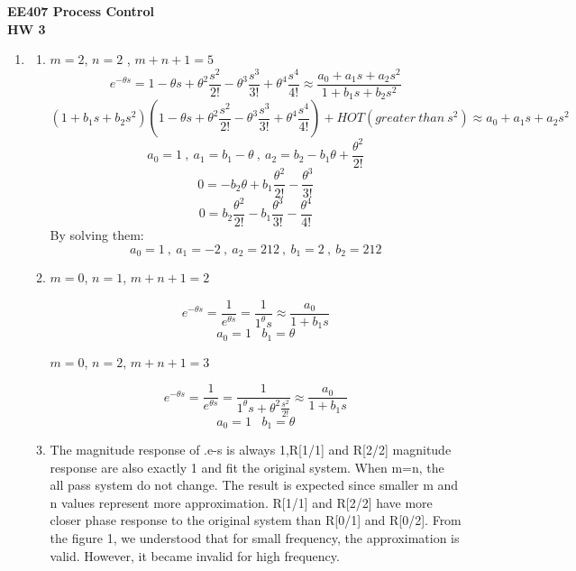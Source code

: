 \documentclass[a4paper,12pt]{article}
\begin{document}
\begin{center}
	\textbf{\large EE407 Process Control \\[0.2cm] HW 3} \\
\end{center}


\begin{enumerate}

	\item
		
			\begin{enumerate}
				\item $ m=2 $, $n=2$ , $m+n+1=5$  
					$$ e^{-\theta s}=1-\theta s+\theta^2 \frac{s^2}{2!}-\theta^3\frac{s^3}{3!}+\theta^4\frac{s^4}{4!} \approx  \frac{a_0+a_1s+a_2s^2}{1+b_1s+b_2s^2}$$
					$$ (1+b_1s+b_2s^2)(1-\theta s+\theta^2 \frac{s^2}{2!}-\theta^3\frac{s^3}{3!}+\theta^4\frac{s^4}{4!})+HOT(greater\ than\ s^2) \approx a_0+a_1s+a_2s^2 $$
					$$ a_0=1\ ,\ a_1=b_1-\theta\ ,\ a_2=b_2-b_1\theta+ \frac{\theta^2}{2!}$$
					$$ 0=-b_2\theta+b_1 \frac{\theta^2}{2!} - \frac{\theta^3}{3!}$$
					$$ 0= b_2 \frac{\theta^2}{2!}-b_1 \frac{\theta^3}{3!}- \frac{\theta^4}{4!}$$ 
			By solving them:
				$$\boxed{ a_0=1}\ ,\ \boxed{a_1=-2}\ ,\ \boxed{a_2=212}\ ,\ \boxed{b_1=2}\ ,\  \boxed{b_2=212} $$ 
				
				\item $m=0$, $n=1$, $m+n+1=2$
				
					$$ e^{-\theta s} = \frac{1}{ e^{\theta s}}=\frac{1}{1^\theta s} \approx \frac{a_0}{1+b_1s} $$
					$$ \boxed{a_0=1}\ \,\ \ \boxed{b_1=\theta}$$
					
					$m=0$, $n=2$, $m+n+1=3$
				
					$$ e^{-\theta s} = \frac{1}{ e^{\theta s}}=\frac{1}{1^\theta s+\theta^2\frac{s^2}{2!}} \approx \frac{a_0}{1+b_1s} $$
					$$ \boxed{a_0=1}\ \,\ \ \boxed{b_1=\theta}$$
					
				
			\item The magnitude response of .e-s is always 1,R[1/1] and R[2/2] magnitude response are also exactly 1 and fit the original system. When m=n, the all pass system do not change.  The result is expected since smaller m and n values represent more approximation. R[1/1] and R[2/2] have more closer phase response to the original system than  R[0/1] and R[0/2].
 From the figure 1, we understood that for small frequency, the approximation is valid. However, it became invalid for high frequency. 


\end{enumerate}
\end{enumerate}
\end{document}
